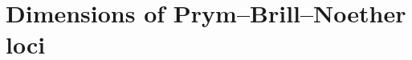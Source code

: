 \documentclass[11pt,reqno]{amsart}
\makeatletter
\newcommand*{\Z}{\mathbb{Z}}
\newcommand*{\abs}[1]{{\lvert #1 \rvert}}
\newcommand*{\ang}[1]{{\langle #1 \rangle}}
\let\@@pmod\pmod
\DeclareRobustCommand{\pmod}{\@ifstar\@pmods\@@pmod}
\def\@pmods#1{\mkern4mu({\operator@font mod}\mkern 6mu#1)}
\newcommand{\todo}[1]{\textcolor{red}{#1}}
\DeclareMathOperator{\codim}{codim}
\theoremstyle{definition}
\theoremstyle{problem}
\theoremstyle{plain}
\theoremstyle{remark}
\newtheorem{remark}[definition]{Remark}
\theoremstyle{theorem}
\numberwithin{equation}{section}
\numberwithin{figure}{section}
\makeatother
\begin{document}

%    



\section{Dimensions of Prym--Brill--Noether loci}
\end{document}
